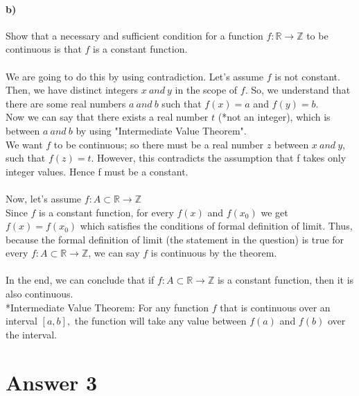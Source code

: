 \documentclass[12pt]{article}
\begin{document}
\paragraph{b)}
Show that a necessary and sufficient condition for a function $f: \mathbb{R} \rightarrow \mathbb{Z}$ to be continuous is that $f$ is a constant function.\\
\\
We are going to do this by using contradiction. Let's assume $f$ is not constant. Then, we have distinct integers $x\ and\ y$ in the scope of $f$. So, we understand that there are some real numbers $a\ and\ b$ such that $f(x) = a$ and $f(y) = b.$\\
Now we can say that there exists a real number $t$ (*not an integer), which is between $a\ and\ b$ by using "Intermediate Value Theorem".\\
We want $f$ to be continuous; so there must be a real number $z$ between $x\ and\ y$, such that $f(z) = t.$ However, this contradicts the assumption that f takes only integer values. Hence f must be a constant.\\
\\
Now, let's assume $f: A \subset \mathbb{R} \rightarrow \mathbb{Z}$ \\
Since $f$ is a constant function, for every $f(x)$ and $f(x_0)$ we get $f(x) = f(x_0)$ which satisfies the conditions of formal definition of limit. Thus, because the formal definition of limit (the statement in the question) is true for every $f: A \subset \mathbb{R} \rightarrow \mathbb{Z}$, we can say $f$ is continuous by the theorem.\\
\\
In the end, we can conclude that if $f: A \subset \mathbb{R} \rightarrow \mathbb{Z}$ is a constant function, then it is also continuous.\\
*Intermediate Value Theorem: For any function $f$ that is continuous over an interval $[a,b],$ the function will take any value between $f(a)$ and $f(b)$ over the interval.



\section*{Answer 3}
\end{document}
